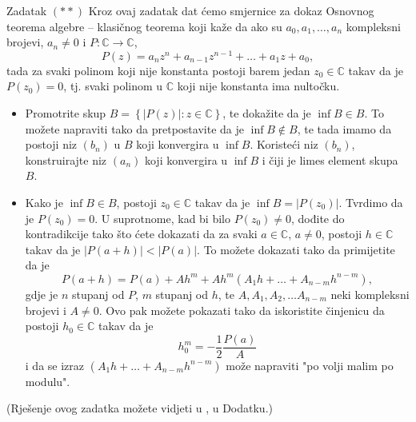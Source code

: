 \begin{exercise}{Zadatak} \((**)\)
Kroz ovaj zadatak dat ćemo smjernice za dokaz Osnovnog teorema algebre -- klasičnog teorema koji kaže da ako su $a_0, a_1, \dots, a_n$ kompleksni brojevi, $a_n\neq 0$ i $P : \mathbb{C}\to \mathbb{C}$,
$$P(z)=a_nz^n+a_{n-1}z^{n-1}+\dots+ a_1z+a_0,$$
tada za svaki polinom koji nije konstanta postoji barem jedan $z_0\in \mathbb{C}$ takav da je $P(z_0)=0$, tj. svaki polinom u $\mathbb{C}$ koji nije konstanta ima nultočku.
\begin{itemize}
\item[a)] Promotrite skup $B=\left\{ \left\lvert P(z)\right\rvert : z\in \mathbb{C}\right\}$, te dokažite da je $\inf{B}\in B$. To možete napraviti tako da pretpostavite da je $\inf{B}\notin B$, te tada imamo da postoji niz $(b_n)$ u $B$ koji konvergira u $\inf{B}$. Koristeći niz $(b_n)$, konstruirajte niz $(a_n)$ koji konvergira u $\inf{B}$ i čiji je limes element skupa $B$.
\item[b)] Kako je $\inf{B}\in B$, postoji $z_0\in \mathbb{C}$ takav da je $\inf{B}=\left\lvert P(z_0)\right\rvert$. Tvrdimo da je $P(z_0)=0$. U suprotnome, kad bi bilo $P(z_0)\neq 0$, dođite do kontradikcije tako što ćete dokazati da za svaki $a\in \mathbb{C}$, $a\neq 0$, postoji $h\in \mathbb{C}$ takav da je $\left\lvert P(a+h)\right\rvert<\left\lvert P(a)\right\rvert$. To možete dokazati tako da primijetite da je
$$P(a+h)=P(a)+Ah^m+Ah^m\left(A_1h+\dots+ A_{n-m}h^{n-m}\right),$$
gdje je $n$ stupanj od $P$, $m$ stupanj od $h$, te $A, A_1, A_2, \dots A_{n-m}$ neki kompleksni brojevi i $A\neq 0$. Ovo pak možete pokazati tako da iskoristite činjenicu da postoji $h_0\in \mathbb{C}$ takav da je
$$h_0^m=-\dfrac{1}{2}\dfrac{P(a)}{A}$$
i da se izraz $\left(A_1h+\dots+ A_{n-m}h^{n-m}\right)$ može napraviti "po volji malim po modulu".
\end{itemize}
(Rješenje ovog zadatka možete vidjeti u \cite{14}, u Dodatku.)
\end{exercise}